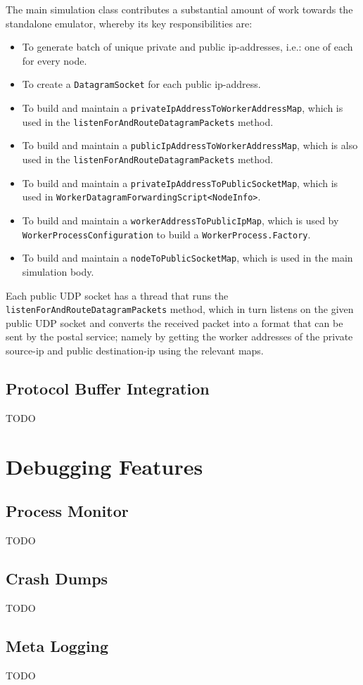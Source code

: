 The main simulation class contributes a substantial amount of work towards the standalone emulator, whereby its key
responsibilities are:
\begin{itemize}
    \item To generate batch of unique private and public ip-addresses, i.e.: one of each for every node.
    \item To create a \texttt{DatagramSocket}\cite{java_DatagramSocket} for each public ip-address.
    \item To build and maintain a \texttt{privateIpAddressToWorkerAddressMap}, which is used in the
    \texttt{listenForAndRouteDatagramPackets} method.
    \item To build and maintain a \texttt{publicIpAddressToWorkerAddressMap}, which is also used in the
    \texttt{listenForAndRouteDatagramPackets} method.
    \item To build and maintain a \texttt{privateIpAddressToPublicSocketMap}, which is used in
    \texttt{WorkerDatagramForwardingScript<NodeInfo>}.
    \item To build and maintain a \texttt{workerAddressToPublicIpMap}, which is used by
    \texttt{WorkerProcessConfiguration} to build a \texttt{WorkerProcess.Factory}.
    \item To build and maintain a \texttt{nodeToPublicSocketMap}, which is used in the main simulation body.
\end{itemize}

Each public UDP socket has a thread that runs the \texttt{listenForAndRouteDatagramPackets} method, which in turn
listens on the given public UDP socket and converts the received packet into a format that can be sent by the postal
service; namely by getting the worker addresses of the private source-ip and public destination-ip using the relevant
maps.

\subsection{Protocol Buffer Integration}\label{subsection:protocol_buffer_integration}

TODO


\section{Debugging Features}\label{section:debugging_features}

\subsection{Process Monitor}\label{subsection:process_monitor}

TODO

\subsection{Crash Dumps}\label{subsection:crash_dumps}

TODO

\subsection{Meta Logging}\label{subsection:meta_logging}

TODO
